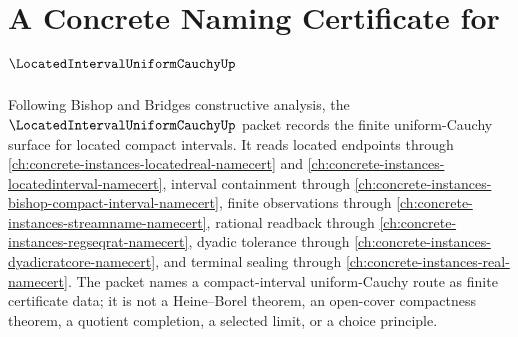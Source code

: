 \chapter{A Concrete Naming Certificate for $\LocatedIntervalUniformCauchyUp$}
\label{ch:concrete-instances-located-interval-uniform-cauchy-namecert}

Following Bishop and Bridges constructive analysis, the $\LocatedIntervalUniformCauchyUp$ packet records the finite uniform-Cauchy surface for located compact intervals. It reads located endpoints through \autoref{ch:concrete-instances-locatedreal-namecert} and \autoref{ch:concrete-instances-locatedinterval-namecert}, interval containment through \autoref{ch:concrete-instances-bishop-compact-interval-namecert}, finite observations through \autoref{ch:concrete-instances-streamname-namecert}, rational readback through \autoref{ch:concrete-instances-regseqrat-namecert}, dyadic tolerance through \autoref{ch:concrete-instances-dyadicratcore-namecert}, and terminal sealing through \autoref{ch:concrete-instances-real-namecert}. The packet names a compact-interval uniform-Cauchy route as finite certificate data; it is not a Heine--Borel theorem, an open-cover compactness theorem, a quotient completion, a selected limit, or a choice principle.

